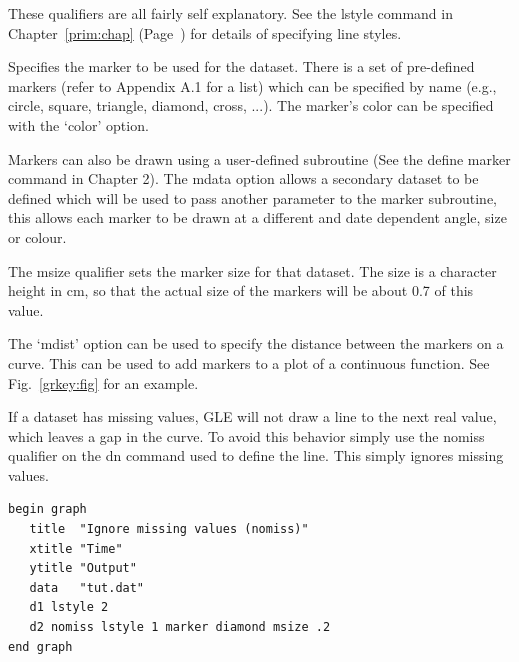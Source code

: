 \begin{commanddescription}
\item[{\sf dn lstyle {\it line-style} lwidth {\it line-width} color {\it col}}  ]
These qualifiers are all fairly self explanatory.  See the {\sf lstyle} command
in Chapter~\ref{prim:chap} (Page~\pageref{lstyle:cmd}) for details of specifying line styles.

\item[{\sf dn marker {\it marker-name} [color {\it c}] [msize {\it marker-size}] [mdata {\it dn}] [mdist {\it dexp}]}]
Specifies the marker to be used for the dataset.  There is a set of pre-defined markers (refer to Appendix A.1 for a list)  which can be specified by name (e.g., {\sf circle, square, triangle, diamond, cross, ...}). The marker's color can be specified with the `{\sf color}' option.

Markers can also be drawn using a user-defined subroutine (See the {\sf define marker} command in Chapter 2).  The {\sf mdata} option allows a secondary dataset to be defined which will be used to pass another parameter to the marker subroutine, this allows each marker to be drawn at a different and date dependent angle, size or colour.

The {\sf msize} qualifier sets the marker size for that dataset. The size is a character height in cm, so that the actual size of the markers will be about 0.7 of this value.

The `{\sf mdist}' option can be used to specify the distance between the markers on a curve. This can be used to add markers to a plot of a continuous function. See Fig.~\ref{grkey:fig} for an example.


\item[{\sf dn nomiss}  ]
If a dataset has missing values, GLE will not draw a line to the next
real value, which leaves a gap in the curve.  To avoid this
behavior simply use the {\sf nomiss} qualifier on the {\sf dn} command
used to define the line. This simply ignores missing values.

\begin{minipage}[c]{8cm}
\begin{Verbatim}
begin graph
   title  "Ignore missing values (nomiss)"
   xtitle "Time"
   ytitle "Output"
   data   "tut.dat"
   d1 lstyle 2
   d2 nomiss lstyle 1 marker diamond msize .2
end graph
\end{Verbatim}
\end{minipage}
\hfill
\begin{minipage}[c]{7cm}
\mbox{}
\end{minipage}


\end{commanddescription}

